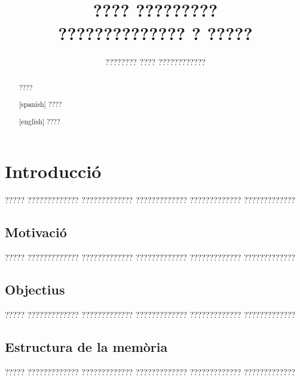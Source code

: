 \documentclass[11pt,catalan,listoffigures,listoftables]{tfgetsinf}
\title{???? ????????? \\
         ?????????????? ? ?????}
\author{???????? ???? ????????????}
\begin{document}

\begin{abstract}
????
\end{abstract}
\begin{abstract}[spanish]
????
\end{abstract}
\begin{abstract}[english]
????
\end{abstract}


\mainmatter


\chapter{Introducci\'o}

????? ????????????? ????????????? ????????????? ????????????? ?????????????

\section{Motivaci\'o}

????? ????????????? ????????????? ????????????? ????????????? ????????????? 

\section{Objectius}

????? ????????????? ????????????? ????????????? ????????????? ?????????????

\section{Estructura de la mem\`oria}

????? ????????????? ????????????? ????????????? ????????????? ????????????? 
\end{document}
